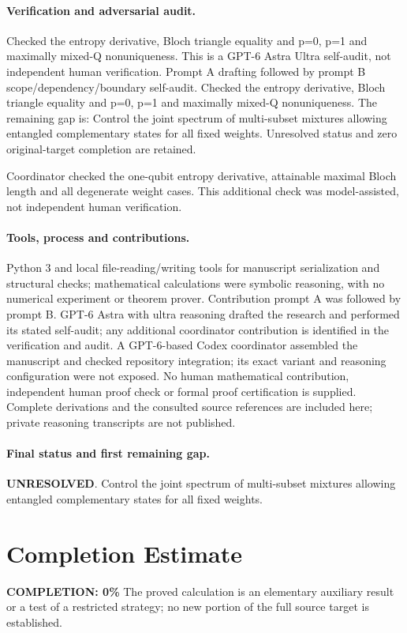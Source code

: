 \documentclass[11pt]{article}
\begin{document}
\paragraph{Verification and adversarial audit.}
Checked the entropy derivative, Bloch triangle equality and p=0, p=1 and maximally mixed-Q nonuniqueness. This is a GPT-6 Astra Ultra self-audit, not independent human verification. Prompt A drafting followed by prompt B scope/dependency/boundary self-audit. Checked the entropy derivative, Bloch triangle equality and p=0, p=1 and maximally mixed-Q nonuniqueness. The remaining gap is: Control the joint spectrum of multi-subset mixtures allowing entangled complementary states for all fixed weights. Unresolved status and zero original-target completion are retained.

Coordinator checked the one-qubit entropy derivative, attainable maximal Bloch length and all degenerate weight cases. This additional check was model-assisted, not independent human verification.

\paragraph{Tools, process and contributions.}
Python 3 and local file-reading/writing tools for manuscript serialization and structural checks; mathematical calculations were symbolic reasoning, with no numerical experiment or theorem prover. Contribution prompt A was followed by prompt B. GPT-6 Astra with ultra reasoning drafted the research and performed its stated self-audit; any additional coordinator contribution is identified in the verification and audit. A GPT-6-based Codex coordinator assembled the manuscript and checked repository integration; its exact variant and reasoning configuration were not exposed. No human mathematical contribution, independent human proof check or formal proof certification is supplied. Complete derivations and the consulted source references are included here; private reasoning transcripts are not published.

\paragraph{Final status and first remaining gap.}
\textbf{UNRESOLVED}. Control the joint spectrum of multi-subset mixtures allowing entangled complementary states for all fixed weights.

\section{Completion Estimate}
\noindent\textbf{COMPLETION: 0\%}
The proved calculation is an elementary auxiliary result or a test of a restricted strategy; no new portion of the full source target is established.
\end{document}
